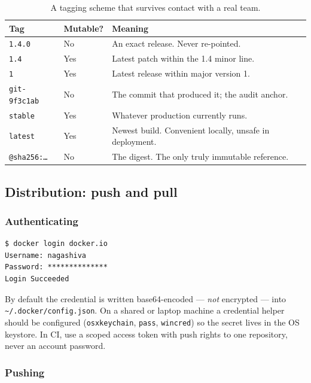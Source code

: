 \documentclass[10pt,a4paper]{article}
\begin{document}
\begin{table}[htbp]
\centering
\caption{A tagging scheme that survives contact with a real team.}
\label{tab:tagging}
\footnotesize
\begin{tabularx}{\linewidth}{@{}l l X@{}}
\toprule
\textbf{Tag} & \textbf{Mutable?} & \textbf{Meaning} \\
\midrule
\texttt{1.4.0}          & No  & An exact release. Never re-pointed. \\
\texttt{1.4}            & Yes & Latest patch within the 1.4 minor line. \\
\texttt{1}              & Yes & Latest release within major version 1. \\
\texttt{git-9f3c1ab}    & No  & The commit that produced it; the audit anchor. \\
\texttt{stable}         & Yes & Whatever production currently runs. \\
\texttt{latest}         & Yes & Newest build. Convenient locally, unsafe in deployment. \\
\texttt{@sha256:\ldots} & No  & The digest. The only truly immutable reference. \\
\bottomrule
\end{tabularx}
\end{table}

\subsection{Distribution: push and pull}

\subsubsection{Authenticating}

\begin{lstlisting}[style=shell]
$ docker login docker.io
Username: nagashiva
Password: **************
Login Succeeded
\end{lstlisting}

By default the credential is written base64-encoded --- \emph{not}
encrypted --- into \texttt{\~{}/.docker/config.json}. On a shared or
laptop machine a credential helper should be configured
(\texttt{osxkeychain}, \texttt{pass}, \texttt{wincred}) so the secret
lives in the OS keystore. In CI, use a scoped access token with push
rights to one repository, never an account password.

\subsubsection{Pushing}
\end{document}
